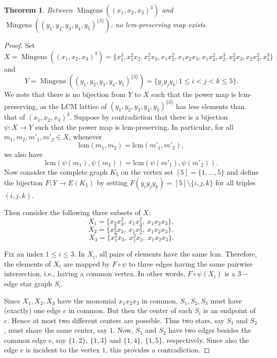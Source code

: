 \documentclass[reqno]{amsart}
\DeclareMathOperator{\mingens}{Mingens}
\newtheorem{theorem}{Theorem}[section]
\theoremstyle{definition}
\theoremstyle{remark}
\numberwithin{equation}{section}
\begin{document}
\begin{theorem}\label{thm:impossible-lcm-map}
    Between $\mingens((x_1,x_2, x_3)^3) $ and $\mingens ((y_1,y_2, y_3,y_4,y_5)^{\{3\}})$, no lcm-preserving map exists.
\end{theorem}

\begin{proof}
    Set
    \[
    X=\mingens((x_1,x_2, x_3)^3)= \{x_1^3,x_1^2x_2,x_1^2x_3,x_1x_2^2,x_1x_2x_3,x_1x_3^2,
x_2^3,x_2^2x_3,x_2x_3^2,x_3^3\}
    \]
    and
\[
Y=\mingens ((y_1,y_2, y_3,y_4,y_5)^{\{3\}})=\{y_i y_j y_k : 1\le i<j<k\le 5\}.
\]
We note that there is no bijection from $Y$ to $X$ such that the power map is lcm-preserving, as the LCM lattice of $(y_1,y_2, y_3,y_4,y_5)^{\{3\}}$ has less elements than that of  $(x_1,x_2, x_3)^3$.
Suppose by contradiction that there is a bijection $\psi:X\to Y$ such that the power map  is lcm-preserving. In particular, for all $m_1,m_2, m'_1,m'_2\in X$, whenever
\[
\mathrm{lcm}(m_1,m_2)=\mathrm{lcm}(m'_1,m'_2),
\]
we also have
\[
\mathrm{lcm}(\psi(m_1),\psi(m_2))
=
\mathrm{lcm}(\psi(m'_1),\psi(m'_2)).
\]
Now consider the complete graph $K_5$ on the vertex set $[5]=\lbrace1,\dots,5\}$ and define the bijection $F:Y\to E(K_5)$ by setting  $F(y_iy_jy_k)=[5]\setminus\lbrace i,j,k\rbrace$ for all triples $(i,j,k)$. 

Then consider the following three subsets of $X$:
\[
X_1=\{x_2x_3^2,\ x_1x_3^2,\ x_1x_2x_3\},
\]
\[
X_2=\{x_2^2x_3,\ x_1x_2^2,\ x_1x_2x_3\},
\]
\[
X_3=\{x_1^2x_3,\ x_1^2x_2,\ x_1x_2x_3\}.
\]

Fix an index $1\leq i\leq 3$. In $X_i$, all pairs of elements have the same lcm. Therefore, the elements of $X_i$ are mapped by $F\circ \psi$ to three edges having the same pairwise intersection, i.e., having a common vertex. In other words, $F\circ \psi(X_i)$ is a $3-$edge star graph $S_i$.

Since  $X_1, X_2, X_3$ have the monomial \(x_1x_2x_3\) in common, $S_1, S_2, S_3$ must have (exactly) one edge $e$ in common. But then the center of each $S_i$ is an endpoint of $e$. Hence at most two different centers are possible. Thus two stars, say $S_1$ and $S_2$, must share the same center, say $1$. Now, $S_1$ and $S_2$ have two edges besides the common edge $e$, say $\lbrace 1,2\rbrace$, $\lbrace 1,3\rbrace$ and  $\lbrace 1,4\rbrace$, $\lbrace 1,5\rbrace$, respectively. Since also the edge $e$ is incident to the vertex $1$, this provides a contradiction. 




\vspace{1em}


\end{proof}
\end{document}
